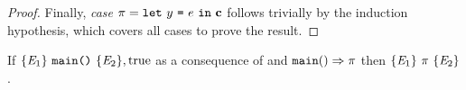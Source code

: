 \begin{proof}

  Finally, \textit{case} $\pi = \texttt{let}\ y\ \texttt{=}\ e\ \texttt{in}\ \mathbf{c}$ follows trivially
  by the induction hypothesis, which covers all cases to prove
  the result.
\end{proof}

\begin{theorem}
  If $\{ \mathit{E}_1 \}\ \texttt{main()}\ \{ \mathit{E}_2 \},\mathrm{true}$ as a consequence of
   and $\texttt{main}() \Rightarrow \pi$ then
  $\{ \mathit{E}_1 \}\ \pi\ \{ \mathit{E}_2 \}$.
\end{theorem}
